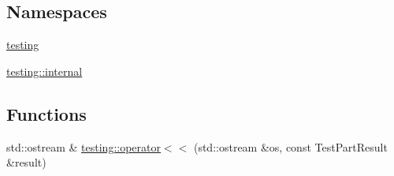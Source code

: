 \subsection*{Namespaces}
\begin{DoxyCompactItemize}
\item 
 \hyperlink{namespacetesting}{testing}
\item 
 \hyperlink{namespacetesting_1_1internal}{testing\+::internal}
\end{DoxyCompactItemize}
\subsection*{Functions}
\begin{DoxyCompactItemize}
\item 
std\+::ostream \& \hyperlink{namespacetesting_a7c88897836b9f492190fb2b9dfa3a327}{testing\+::operator$<$$<$} (std\+::ostream \&os, const Test\+Part\+Result \&result)
\end{DoxyCompactItemize}
